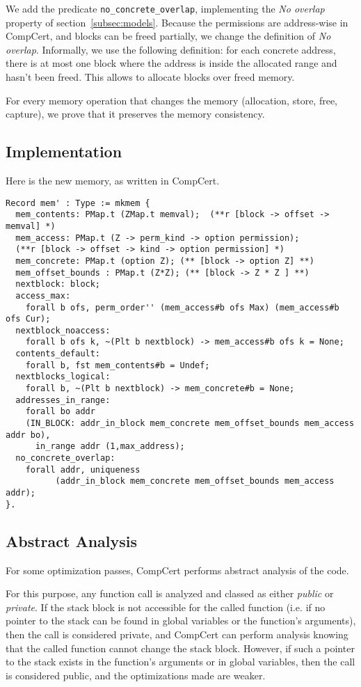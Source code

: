 We add the predicate \texttt{no\_concrete\_overlap}, implementing the \textit{No overlap} property of section~\ref{subsec:models}. Because the permissions are address-wise in CompCert, and blocks can be freed partially, we change the definition of \textit{No overlap}. Informally, we use the following definition: for each concrete address, there is at most one block where the address is inside the allocated range and hasn't been freed. This allows to allocate blocks over freed memory.

For every memory operation that changes the memory (allocation, store, free, capture), we prove that it preserves the memory consistency.

\subsection{Implementation}
Here is the new memory, as written in CompCert.
{\footnotesize
\begin{lstlisting}
Record mem' : Type := mkmem {
  mem_contents: PMap.t (ZMap.t memval);  (**r [block -> offset -> memval] *)
  mem_access: PMap.t (Z -> perm_kind -> option permission);
  (**r [block -> offset -> kind -> option permission] *)
  mem_concrete: PMap.t (option Z); (** [block -> option Z] **)
  mem_offset_bounds : PMap.t (Z*Z); (** [block -> Z * Z ] **)
  nextblock: block;
  access_max:
    forall b ofs, perm_order'' (mem_access#b ofs Max) (mem_access#b ofs Cur);
  nextblock_noaccess:
    forall b ofs k, ~(Plt b nextblock) -> mem_access#b ofs k = None;
  contents_default:
    forall b, fst mem_contents#b = Undef;
  nextblocks_logical:
    forall b, ~(Plt b nextblock) -> mem_concrete#b = None;
  addresses_in_range:
    forall bo addr
    (IN_BLOCK: addr_in_block mem_concrete mem_offset_bounds mem_access addr bo),
      in_range addr (1,max_address);
  no_concrete_overlap:
    forall addr, uniqueness
          (addr_in_block mem_concrete mem_offset_bounds mem_access addr);
}.
\end{lstlisting}}


\subsection{Abstract Analysis}

For some optimization passes, CompCert performs abstract analysis of the code.

For this purpose, any function call is analyzed and classed as either \textit{public} or \textit{private}. If the stack block is not accessible for the called function (i.e. if no pointer to the stack can be found in global variables or the function's arguments), then the call is considered private, and CompCert can perform analysis knowing that the called function cannot change the stack block. However, if such a pointer to the stack exists in the function's arguments or in global variables, then the call is considered public, and the optimizations made are weaker.

